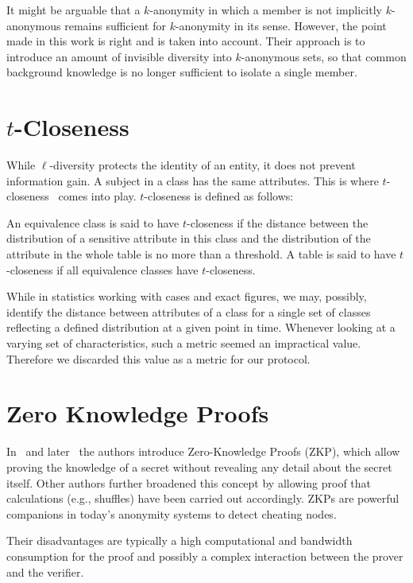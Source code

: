 It might be arguable that a $k$-anonymity in which a member is not implicitly $k$-anonymous remains sufficient for $k$-anonymity in its sense. However, the point made in this work is right and is taken into account. Their approach is to introduce an amount of invisible diversity into $k$-anonymous sets, so that common background knowledge is no longer sufficient to isolate a single member.

\section{\texorpdfstring{$t$}{t}-Closeness}
While $\ell$-diversity protects the identity of an entity, it does not prevent information gain. A subject in a class has the same attributes. This is where $t$-closeness~\cite{li2007t} comes into play. $t$-closeness is defined as follows:

\begin{shadequote}{}
	An equivalence class is said to have $t$-closeness if the distance between the distribution of a sensitive attribute in this class and the distribution of the attribute in the whole table is no more than a threshold. A table is said to have $t$-closeness if all equivalence classes have $t$-closeness.
\end{shadequote}

While in statistics working with cases and exact figures, we may, possibly, identify the distance between attributes of a class for a single set of classes reflecting a defined distribution at a given point in time. Whenever looking at a varying set of characteristics, such a metric seemed an impractical value. Therefore we discarded this value as a metric for our protocol.

\section{Zero Knowledge Proofs}
In~\cite{goldwasser1989knowledge} and later~\cite{de1987non} the authors introduce Zero-Knowledge Proofs (ZKP), which allow proving the knowledge of a secret without revealing any detail about the secret itself. Other authors further broadened this concept by allowing proof that calculations (e.g., shuffles) have been carried out accordingly. ZKPs are powerful companions in today's anonymity systems to detect cheating nodes.

Their disadvantages are typically a high computational and bandwidth consumption for the proof and possibly a complex interaction between the prover and the verifier.

